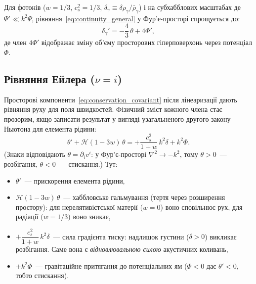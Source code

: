 Для фотонів ($w = 1/3$, $c_s^2 = 1/3$,
$\delta_\gamma \equiv \delta\rho_\gamma/\bar\rho_\gamma$)
і на субхабблових масштабах де $\Psi' \ll k^2\Psi$,
рівняння~\eqref{eq:continuity_general} у Фур'є-просторі
спрощується до:
\begin{equation}\label{eq:continuity_photon}
  \delta_\gamma' = -\frac{4}{3}\,\theta + 4\Phi',
\end{equation}
де член $4\Phi'$ відображає зміну об'єму просторових
гіперповерхонь через потенціал $\Phi$.

\subsection*{Рівняння Ейлера ($\nu = i$)}

Просторові компоненти~\eqref{eq:conservation_covariant}
після лінеаризації дають рівняння руху для поля швидкостей.
Фізичний зміст кожного члена стає прозорим, якщо записати
результат у вигляді узагальненого другого закону Ньютона для
елемента рідини:
\begin{equation}\label{eq:euler_general}
  \theta' + \mathcal{H}(1 - 3w)\,\theta
  = +\frac{c_s^2}{1+w}\,k^2\delta + k^2\Phi.
\end{equation}
(Знаки відповідають $\theta = \partial_i v^i$: у Фур'є-просторі $\nabla^2 \to -k^2$, тому
$\theta > 0$~--- розбігання, $\theta < 0$~--- стискання.) Тут:
\begin{itemize}
  \item $\theta'$~--- прискорення елемента рідини,
  \item $\mathcal{H}(1-3w)\,\theta$~--- хаббловське
        гальмування (тертя через розширення простору):
        для нерелятивістської матерії ($w=0$) воно сповільнює
        рух, для радіації ($w=1/3$) воно зникає,
  \item $+\dfrac{c_s^2}{1+w}\,k^2\delta$~---
        сила градієнта тиску: надлишок густини ($\delta>0$) викликає
        розбігання. Саме вона є \emph{відновлювальною
        силою} акустичних коливань,
  \item $+k^2\Phi$~--- гравітаційне притягання до потенціальних
        ям ($\Phi<0$ дає $\theta'<0$, тобто стискання).
\end{itemize}

